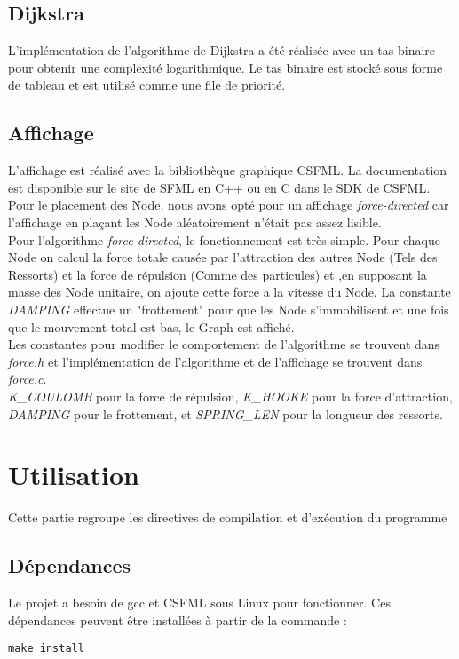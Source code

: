\documentclass{article}
\begin{document}
\subsection{Dijkstra}
L'implémentation de l'algorithme de Dijkstra a été réalisée avec un tas binaire pour obtenir une complexité logarithmique.
Le tas binaire est stocké sous forme de tableau et est utilisé comme une file de priorité.

\subsection{Affichage}

L'affichage est réalisé avec la bibliothèque graphique CSFML. La documentation est disponible sur le site de SFML en C++ ou en C dans le SDK de CSFML. Pour le placement des Node, nous avons opté pour un affichage \textit{force-directed} car l'affichage en plaçant les Node aléatoirement n'était pas assez lisible. \\
Pour l'algorithme \textit{force-directed}, le fonctionnement est très simple. Pour chaque Node on calcul la force totale causée par l'attraction des autres Node (Tels des Ressorts) et la force de répulsion (Comme des particules) et ,en supposant la masse des Node unitaire, on ajoute cette force a la vitesse du Node. La constante \textit{DAMPING} effectue un "frottement" pour que les Node s'immobilisent et une fois que le mouvement total est bas, le Graph est affiché. \\
Les constantes pour modifier le comportement de l'algorithme se trouvent dans \textit{force.h} et l'implémentation de l'algorithme et de l'affichage se trouvent dans \textit{force.c}. \\
\textit{K\_COULOMB} pour la force de répulsion, \textit{K\_HOOKE} pour la force d'attraction, \textit{DAMPING} pour le frottement, et \textit{SPRING\_LEN} pour la longueur des ressorts.

\break\section{Utilisation}
Cette partie regroupe les directives de compilation et d'exécution du programme
\subsection{Dépendances}
Le projet a besoin de gcc et CSFML sous Linux pour fonctionner. Ces dépendances peuvent être installées à partir de la commande :
\begin{verbatim}
make install
\end{verbatim}
\end{document}
